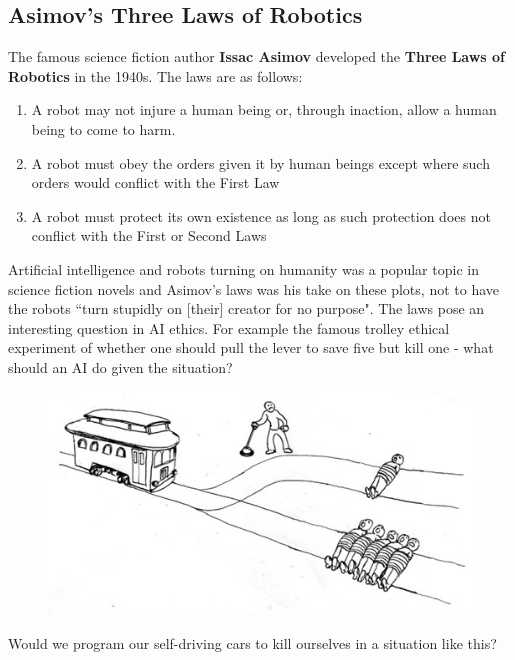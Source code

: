 \documentclass{article}
\begin{document}
\subsection{Asimov's Three Laws of Robotics}
The famous science fiction author \textbf{Issac Asimov} developed the \textbf{Three Laws of Robotics} in the 1940s. The laws are as follows:
\begin{enumerate}
\item A robot may not injure a human being or, through inaction, allow a human being to come to harm.
\item A robot must obey the orders given it by human beings except where such orders would conflict with the First Law
\item A robot must protect its own existence as long as such protection does not conflict with the First or Second Laws
\end{enumerate}
\noindent
Artificial intelligence and robots turning on humanity was a popular topic in science fiction novels and Asimov's laws was his take on these plots, not to have the robots ``turn stupidly on [their] creator for no purpose". The laws pose an interesting question in AI ethics. For example the famous trolley ethical experiment of whether one should pull the lever to save five but kill one - what should an AI do given the situation?

\begin{figure}[H]
\centering
\includegraphics[width=1\textwidth, keepaspectratio]{imgs/trolley.jpg}
\end{figure}
\noindent
Would we program our self-driving cars to kill ourselves in a situation like this?
\end{document}

